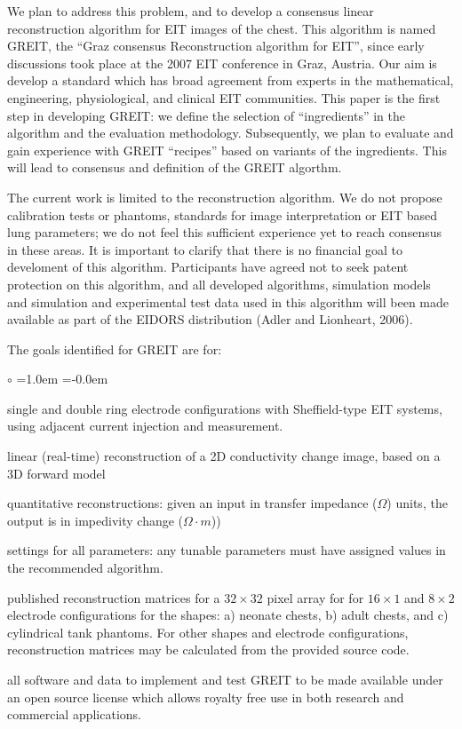 \documentclass[letterpaper,twocolumn,11pt]{article}
\begin{document}
We plan to address this problem, and to develop a
consensus linear reconstruction algorithm for EIT
images of the chest.
This algorithm is named GREIT, 
the ``Graz consensus Reconstruction algorithm for EIT'',
since early discussions took place at the 2007 EIT conference
in Graz, Austria. Our aim is develop a standard which
has broad agreement from experts in the mathematical,
engineering, physiological, and clinical EIT communities.
This paper is the first step in developing GREIT:
we define the selection of ``ingredients'' in the
algorithm and the evaluation 
methodology. Subsequently, we plan to evaluate
and gain experience with GREIT ``recipes'' based on 
variants of the ingredients. This will lead to 
consensus and definition of the GREIT algorthm.

The current work is limited to the reconstruction algorithm.
We do not propose calibration tests or phantoms, standards
for image interpretation or EIT based lung parameters; 
we do not feel this sufficient experience yet to reach
consensus in these areas.
It is important to clarify that there is no financial
goal to develoment of this algorithm. Participants have
agreed not to seek patent protection on this algorithm,
and all developed algorithms, simulation
models and simulation and experimental test data used
in this algorithm will been made available as part of
the EIDORS distribution (Adler and Lionheart, 2006).

The goals identified for GREIT are for:
\begin{list}{$\circ$} %
  {\leftmargin=1.0em \itemindent=-0.0em
    \baselineskip
    \baselineskip}
\item
 single and double ring electrode
configurations with Sheffield-type EIT systems, using
      adjacent current injection and measurement.
\item
 linear (real-time) reconstruction of a 2D conductivity
change image, based on a 3D forward model
\item
 quantitative reconstructions:
   given an input in transfer impedance ($\Omega$) units,
                    the output is in impedivity change ($\Omega\cdot m$))
\item
 settings for all parameters:
     any tunable parameters must have assigned
     values in the recommended algorithm.
\item
 published reconstruction matrices for
      a $32\times 32$ pixel array for
      for $16\times1$ and $8\times 2$
      electrode configurations for the shapes:
   a) neonate chests, 
   b) adult chests, and 
   c) cylindrical tank phantoms.
 For other shapes and electrode configurations,
   reconstruction matrices may be calculated from the
   provided source code.

\item
   all software and data to implement and test GREIT to be
   made available under an open source license which allows 
   royalty free use in both research and commercial applications.

\end{list}
\vspace{1cm}
\end{document}
